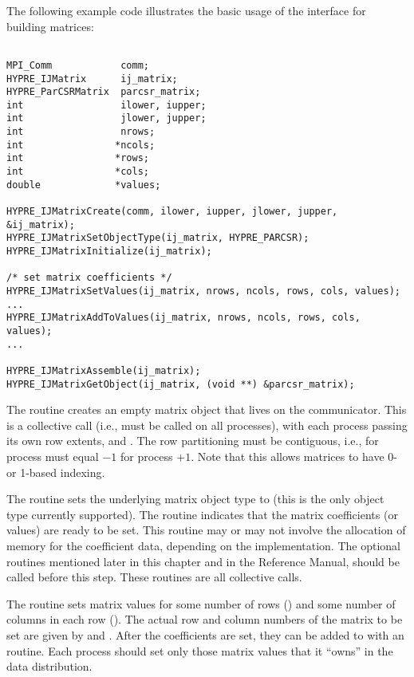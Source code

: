 The following example code illustrates the basic usage of the
 interface for building matrices:
\begin{display}
\begin{verbatim}

MPI_Comm            comm;
HYPRE_IJMatrix      ij_matrix;
HYPRE_ParCSRMatrix  parcsr_matrix;
int                 ilower, iupper;
int                 jlower, jupper;
int                 nrows;
int                *ncols;
int                *rows;
int                *cols;
double             *values;

HYPRE_IJMatrixCreate(comm, ilower, iupper, jlower, jupper, &ij_matrix);
HYPRE_IJMatrixSetObjectType(ij_matrix, HYPRE_PARCSR);
HYPRE_IJMatrixInitialize(ij_matrix);

/* set matrix coefficients */
HYPRE_IJMatrixSetValues(ij_matrix, nrows, ncols, rows, cols, values);
...
HYPRE_IJMatrixAddToValues(ij_matrix, nrows, ncols, rows, cols, values);
...

HYPRE_IJMatrixAssemble(ij_matrix);
HYPRE_IJMatrixGetObject(ij_matrix, (void **) &parcsr_matrix);

\end{verbatim}
\end{display}
The  routine creates an empty matrix object that lives
on the  communicator.  This is a collective call (i.e.,
must be called on all processes), with each process passing its own
row extents,  and .  The row partitioning
must be contiguous, i.e.,  for process  must
equal $-1$ for process $+1$.  Note that this
allows matrices to have 0- or 1-based indexing.

The  routine sets the underlying matrix object
type to  (this is the only object type currently
supported).  The  routine indicates that the matrix
coefficients (or values) are ready to be set.  This routine may or may
not involve the allocation of memory for the coefficient data,
depending on the implementation.  The optional  routines
mentioned later in this chapter and in the Reference Manual, should be
called before this step.  These routines are all collective calls.

The  routine sets matrix values for some number of
rows () and some number of columns in each row
().  The actual row and column numbers of the matrix
 to be set are given by  and .
After the coefficients are set, they can be added to with an
 routine.  Each process should set only those matrix
values that it ``owns'' in the data distribution.

